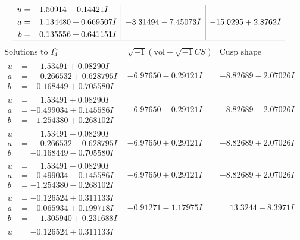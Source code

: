 \documentclass[1p]{elsarticle_modified}
\theoremstyle{definition}
\newcommand{\I}{\sqrt{-1}}
\begin{document}
$$\begin{array}{c|c|c}
\begin{aligned}
u &= -1.50914 - 0.14421 I \\
a &= \phantom{-}1.134480 + 0.669507 I \\
b &= \phantom{-}0.135556 + 0.641151 I\end{aligned}
 & -3.31494 - 7.45073 I & -15.0295 + 2.8762 I\\
 \hline 
 \end{array}$$\newpage$$\begin{array}{c|c|c}  
\text{Solutions to }I^u_{4}& \I (\text{vol} + \sqrt{-1}CS) & \text{Cusp shape}\\
 \hline 
\begin{aligned}
u &= \phantom{-}1.53491 + 0.08290 I \\
a &= \phantom{-}0.266532 + 0.628795 I \\
b &= -0.168449 + 0.705580 I\end{aligned}
 & -6.97650 - 0.29121 I & -8.82689 - 2.07026 I \\ \hline\begin{aligned}
u &= \phantom{-}1.53491 + 0.08290 I \\
a &= -0.499034 + 0.145586 I \\
b &= -1.254380 + 0.268102 I\end{aligned}
 & -6.97650 - 0.29121 I & -8.82689 - 2.07026 I \\ \hline\begin{aligned}
u &= \phantom{-}1.53491 - 0.08290 I \\
a &= \phantom{-}0.266532 - 0.628795 I \\
b &= -0.168449 - 0.705580 I\end{aligned}
 & -6.97650 + 0.29121 I & -8.82689 + 2.07026 I \\ \hline\begin{aligned}
u &= \phantom{-}1.53491 - 0.08290 I \\
a &= -0.499034 - 0.145586 I \\
b &= -1.254380 - 0.268102 I\end{aligned}
 & -6.97650 + 0.29121 I & -8.82689 + 2.07026 I \\ \hline\begin{aligned}
u &= -0.126524 + 0.311133 I \\
a &= -0.065934 + 0.199718 I \\
b &= \phantom{-}1.305940 + 0.231688 I\end{aligned}
 & -0.91271 - 1.17975 I & \phantom{-}13.3244 - 8.3971 I \\ \hline\begin{aligned}
u &= -0.126524 + 0.311133 I \\

\end{aligned}
\end{array}$$
\end{document}
